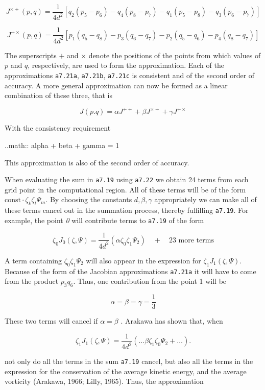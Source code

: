 \[J^{\times +}(p,q) = \frac{1}{4d^2} \left[ q_2(p_5 - p_6) - q_4(p_8-p_7)
-q_1(p_5 - p_8) - q_3(p_6-p_7)  \right]\]

\[J^{+ \times}(p,q) = \frac{1}{4d^2} \left[ p_1(q_5 - q_8) - p_3(q_6 - q_7)
- p_2(q_5 - q_6) - p_4(q_8 - q_7)  \right]\]

The superscripts \(+\) and \(\times\) denote the positions of the points
from which values of \(p\) and \(q\), respectively, are used to form the
approximation. Each of the approximations \texttt{a7.21a},
\texttt{a7.21b}, \texttt{a7.21c} is consistent and of the second order
of accuracy. A more general approximation can now be formed as a linear
combination of these three, that is

\[J(p.q) = \alpha J^{++} + \beta J^{\times +} + \gamma J^{+\times}\]

With the consistency requirement

..math:: alpha + beta + gamma = 1

This approximation is also of the second order of accuracy.

When evaluating the sum in \texttt{a7.19} using \texttt{a7.22} we obtain
24 terms from each grid point in the computational region. All of these
terms will be of the form
\(\text{const} \cdot\zeta_{k}\zeta_{l}\Psi_{m}\). By choosing the
constants \(d,\beta,\gamma\) appropriately we can make all of these
terms cancel out in the summation process, thereby fulfilling
\texttt{a7.19}. For example, the point \emph{0} will contribute terms to
\texttt{a7.19} of the form

\[\zeta_0 J_0( \zeta,\Psi ) = \frac{1}{4d^{2}}\left( \alpha \zeta_{0} \zeta_{1}\Psi_{2} \right)
\quad + \quad \text{23 more terms}\]

A term containing \(\zeta_{0}\zeta_{1}\Psi_{2}\) will also appear in the
expression for \(\zeta_{1}J_{1}\left( \zeta,\Psi \right)\). Because of
the form of the Jacobian approximations \texttt{a7.21a} it will have to
come from the product \(p_{3}q_{6}\). Thus, one contribution from the
point 1 will be

\[\alpha = \beta = \gamma = \frac{1}{3}\]

These two terms will cancel if \(\alpha = \beta\) . Arakawa has shown
that, when

\[\zeta_{1}J_{1}\left( \zeta,\Psi \right) = \frac{1}{4d^{2}}\left( \ldots\beta\zeta_{1}\zeta_{0}\Psi_{2} + \ldots \right).\]

not only do all the terms in the sum \texttt{a7.19} cancel, but also all
the terms in the expression for the conservation of the average kinetic
energy, and the average vorticity (Arakawa, 1966; Lilly, 1965). Thus,
the approximation

